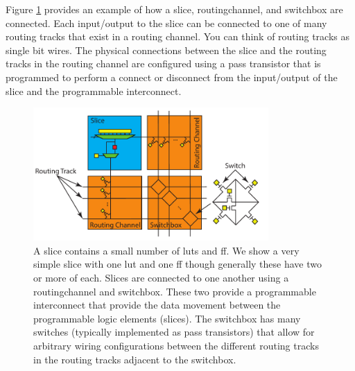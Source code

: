 Figure \ref{fig:slice_channel} provides an example of how a \gls{slice}, \gls{routingchannel}, and \gls{switchbox} are connected. Each input/output to the \gls{slice} can be connected to one of many routing tracks that exist in a routing channel. You can think of routing tracks as single bit wires. The physical connections between the slice and the routing tracks in the routing channel are configured using a pass transistor that is programmed to perform a connect or disconnect from the input/output of the slice and the programmable interconnect. 

\begin{figure}
\centering
\includegraphics[width= 0.8\textwidth]{images/slice_channel}
\caption{ A \gls{slice} contains a small number of \glspl{lut} and \gls{ff}. We show a very simple \gls{slice} with one \gls{lut} and one \gls{ff} though generally these have two or more of each. Slices are connected to one another using a \gls{routingchannel} and \gls{switchbox}. These two provide a programmable interconnect that provide the data movement between the programmable logic elements (\glspl{slice}). The \gls{switchbox} has many switches (typically implemented as pass transistors) that allow for arbitrary wiring configurations between the different routing tracks in the routing tracks adjacent to the switchbox. }
\label{fig:slice_channel}
\end{figure}

